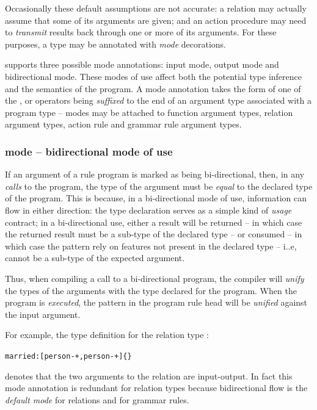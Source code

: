 Occasionally these default assumptions are not accurate: a relation may actually assume that some of its arguments are given; and an action procedure may need to \emph{transmit} results back through one or more of its arguments. For these purposes, a type may be annotated with \emph{mode} decorations.

\go supports three possible mode annotations: input mode, output mode and bidirectional mode. These modes of use affect both the potential type inference and the semantics of the program. A mode annotation takes the form of one of the \q{-}, \q{+} or \q{-+} operators being \emph{suffixed} to the end of an argument type associated with a program type -- modes may be attached to function argument types, relation argument types, action rule and grammar rule argument types.

\subsubsection{\q{-+} mode -- bidirectional mode of use}

If an argument of a rule program is marked as being bi-directional, then, in any \emph{calls} to the program, the type of the argument must be \emph{equal} to the declared type of the program. This is because, in a bi-directional mode of use, information can flow in either direction: the type declaration serves as a simple kind of \emph{usage} contract; in a bi-directional use, either a result will be returned -- in which case the returned result must be a sub-type of the declared type -- or consumed -- in which case the pattern rely on features not present in the declared type -- i..e, cannot be a sub-type of the expected argument.

Thus, when compiling a call to a bi-directional program, the compiler will \emph{unify} the types of the arguments with the type declared for the program. When the program is \emph{executed}, the pattern in the program rule head will be \emph{unified} against the input argument.

For example, the type definition for the relation type :
\begin{alltt}
married:[person-+,person-+]\{\}
\end{alltt}
denotes that the two arguments to the  relation are input-output. In fact this mode annotation is redundant for relation types because bidirectional flow is the \emph{default mode} for relations and for grammar rules.

